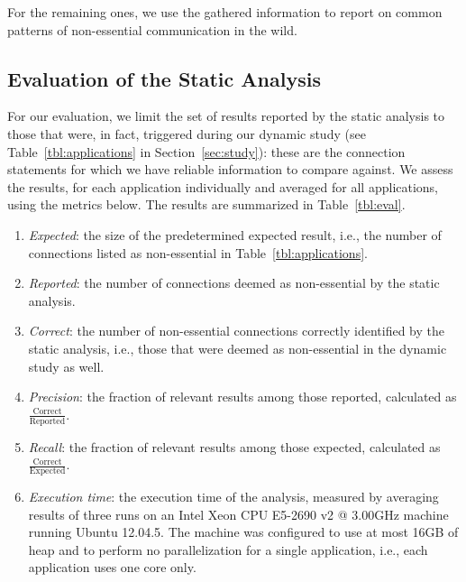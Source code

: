 For the remaining ones, we use the gathered information to report on common patterns of non-essential communication in the wild.

\subsection{Evaluation of the Static Analysis}
For our evaluation, we limit the set of results reported by the static analysis to those that were, in fact,
 triggered during our dynamic study (see Table~\ref{tbl:applications} in Section~\ref{sec:study}): these are the connection statements for which we have reliable information to compare against. 
We assess the results, for each application individually and averaged for all applications, using the metrics below. The results are summarized in Table~\ref{tbl:eval}.

\begin{enumerate}[leftmargin=0.5cm]%
\item
\emph{Expected}: the size of the predetermined expected result, i.e., the number of connections listed as non-essential in Table~\ref{tbl:applications}.
\item
\emph{Reported}: the number of connections deemed as non-essential by the static analysis. 
\item
 \emph{Correct}: the number of non-essential connections correctly identified by the static analysis, i.e., those that were deemed as non-essential in the dynamic study as well.
\item
\emph{Precision}: the fraction of relevant results among those reported,
 calculated as \emph{$\frac{\text{Correct}}{\text{Reported}}$}. 
\item
\emph{Recall}: the fraction of relevant results among those expected, calculated as
\emph{$\frac{\text{Correct}}{\text{Expected}}$}.
\item \emph{Execution time}: the execution time of the analysis, measured by averaging results of
three runs on an Intel\textsuperscript{\textregistered} Xeon\textsuperscript{\textregistered} CPU E5-2690 v2 @ 3.00GHz machine running Ubuntu 12.04.5. The machine was configured to use at most 16GB of heap and to perform no parallelization for a single application, i.e., each application uses one core only.
\end{enumerate}
  
